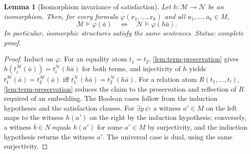 \documentclass[11pt,oneside,openany]{book}
\theoremstyle{definition}
\theoremstyle{plain}
\newtheorem{lemma}[definition]{Lemma}
\theoremstyle{remark}
\newcommand{\entails}{\models}
\begin{document}
\begin{lemma}[Isomorphism invariance of satisfaction]
\label{lem:iso-invariance}
Let \(h:\mathcal M\to\mathcal N\) be an isomorphism.  Then, for every
formula \(\varphi(x_1,\ldots,x_k)\) and all \(a_1,\ldots,a_k\in M\),
\[
  \mathcal M\entails\varphi(\bar a)
  \quad\Longleftrightarrow\quad
  \mathcal N\entails\varphi(h\bar a).
\]
In particular, isomorphic structures satisfy the same sentences.
\textit{Status: complete proof.}
\end{lemma}
\begin{proof}
Induct on \(\varphi\).  For an equality atom \(t_1=t_2\),
\cref{lem:term-preservation} gives
\(h(t_i^{\mathcal M}(\bar a))=t_i^{\mathcal N}(h\bar a)\) for both terms,
and injectivity of \(h\) yields
\(t_1^{\mathcal M}(\bar a)=t_2^{\mathcal M}(\bar a)\) iff
\(t_1^{\mathcal N}(h\bar a)=t_2^{\mathcal N}(h\bar a)\).  For a relation
atom \(R(t_1,\ldots,t_l)\), \cref{lem:term-preservation} reduces the claim
to the preservation and reflection of \(R\) required of an embedding.
The Boolean cases follow from the induction hypotheses and the
satisfaction clauses.  For \(\exists y\,\psi\): a witness \(a'\in M\) on
the left maps to the witness \(h(a')\) on the right by the induction
hypothesis; conversely, a witness \(b\in N\) equals \(h(a')\) for some
\(a'\in M\) by surjectivity, and the induction hypothesis returns the
witness \(a'\).  The universal case is dual, using the same surjectivity.
\end{proof}
\end{document}
